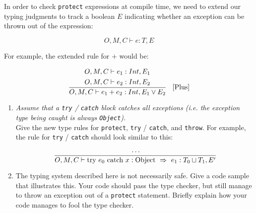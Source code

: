 \documentclass[12pt]{article} \usepackage{color} \usepackage{amsmath} \usepackage{amssymb}
\begin{document}
\begin{enumerate}
{In order to check \texttt{protect} expressions at compile time, we
need to extend our typing judgments to track a boolean $E$ indicating
whether an exception can be thrown out of the expression:

$$
O,M,C \vdash e : T, E
$$

For example, the extended rule for $+$ would be:

$$
\cfrac{
\begin{aligned}
O,M,C & \vdash e_1 : Int, E_1 \\
O,M,C & \vdash e_2 : Int, E_2
\end{aligned}}
{O,M,C \vdash e_1 + e_2 : Int , E_1 \vee E_2 }
\quad \text{[Plus]}
$$

\begin{enumerate}
\item{\emph{Assume that a \texttt{try} / \texttt{catch} block catches all
exceptions (i.e. the exception type being caught is always
\texttt{Object}).}
\\

Give the new type rules for \texttt{protect}, \texttt{try} /
\texttt{catch}, and \texttt{throw}. For example, the rule for
\texttt{try} / \texttt{catch} should look similar to this:
$$
\cfrac{
\ldots
}
{O, M, C \vdash \text{try} \ e_0 \ \text{catch} \ x : \text{Object} \  \Rightarrow \ e_1 : T_0 \sqcup T_1, E'}
$$
 }
\item{The typing system described here is not necessarily safe. Give a
code sample that illustrates this. Your code should pass the type
checker, but still manage to throw an exception out of a
\texttt{protect} statement. Briefly explain how your code manages to
fool the type checker.}
\end{enumerate}
}
\end{enumerate}
\end{document}
